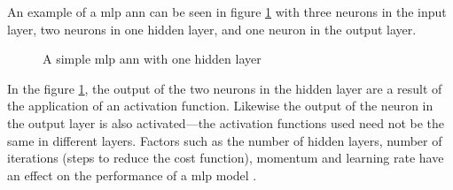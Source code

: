 An example of a \gls{mlp} \gls{ann} can be seen in figure \ref{fig:mlp}  with three neurons in the input layer, two neurons in one hidden layer, and one neuron in the output layer.

\begin{figure}[H]
    \centering
    \caption{A simple \gls{mlp} \gls{ann} with one hidden layer}
    \label{fig:mlp}
\end{figure}

In the figure \ref{fig:mlp}, the output of the two neurons in the hidden layer are a result of the application of an activation function.
Likewise the output of the neuron in the output layer is also activated---the activation functions used need not be the same in different layers.
Factors such as the number of hidden layers, number of iterations (steps to reduce the cost function), momentum and learning rate have an effect on the performance of a \gls{mlp} model \cite{taud2018multilayer}.
